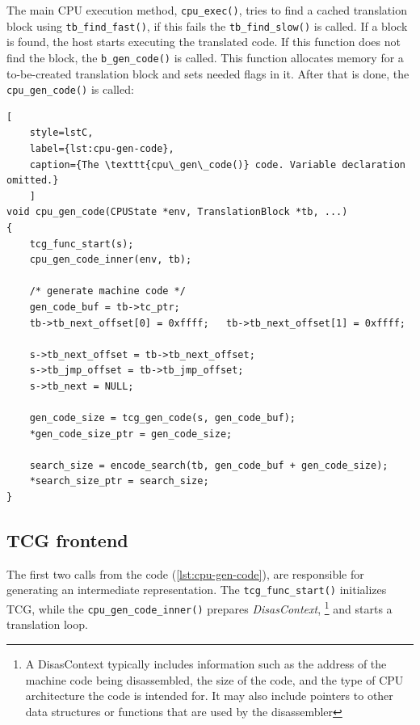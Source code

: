 The main CPU execution method, \texttt{cpu\_exec()}, tries to find a cached translation block using
\texttt{tb\_find\_fast()}, if this fails the \texttt{tb\_find\_slow()} is called. If a block is found, the host starts
executing the translated code. If this function does not find the block, the \texttt{b\_gen\_code()} is called.
This function allocates memory for a to-be-created translation block and sets needed flags in it. After that is done,
the \texttt{cpu\_gen\_code()} is called:

\nopagebreak[4]
\begin{lstlisting}[
    style=lstC,
    label={lst:cpu-gen-code},
    caption={The \texttt{cpu\_gen\_code()} code. Variable declaration omitted.}
    ]
void cpu_gen_code(CPUState *env, TranslationBlock *tb, ...)
{
    tcg_func_start(s);
    cpu_gen_code_inner(env, tb);

    /* generate machine code */
    gen_code_buf = tb->tc_ptr;
    tb->tb_next_offset[0] = 0xffff;   tb->tb_next_offset[1] = 0xffff;

    s->tb_next_offset = tb->tb_next_offset;
    s->tb_jmp_offset = tb->tb_jmp_offset;
    s->tb_next = NULL;

    gen_code_size = tcg_gen_code(s, gen_code_buf);
    *gen_code_size_ptr = gen_code_size;

    search_size = encode_search(tb, gen_code_buf + gen_code_size);
    *search_size_ptr = search_size;
}
\end{lstlisting}

\subsection{TCG frontend}
\label{sec:tcg-frontend}

The first two calls from the code (\ref{lst:cpu-gen-code}), are responsible for generating an intermediate
representation. The \texttt{tcg\_func\_start()} initializes TCG, while the \texttt{cpu\_gen\_code\_inner()} prepares
\textit{DisasContext},%
\footnote{A DisasContext typically includes information such as the address of the machine code being disassembled,
the size of the code, and the type of CPU architecture the code is intended for. It may also include pointers to other
data structures or functions that are used by the disassembler}
and starts a translation loop.

